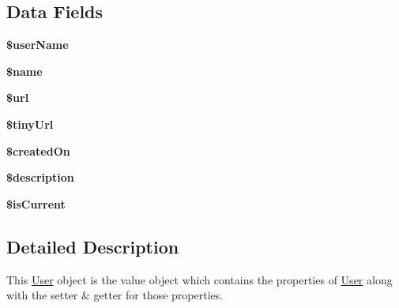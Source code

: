 \subsection*{Data Fields}
\begin{DoxyCompactItemize}
\item 
\hypertarget{class_avatar_aff20833df389a26c0f9384512eec4a68}{{\bfseries \$user\+Name}}\label{class_avatar_aff20833df389a26c0f9384512eec4a68}

\item 
\hypertarget{class_avatar_ab2fc40d43824ea3e1ce5d86dee0d763b}{{\bfseries \$name}}\label{class_avatar_ab2fc40d43824ea3e1ce5d86dee0d763b}

\item 
\hypertarget{class_avatar_acf215f34a917d014776ce684a9ee8909}{{\bfseries \$url}}\label{class_avatar_acf215f34a917d014776ce684a9ee8909}

\item 
\hypertarget{class_avatar_a9c2c8dd33e943747d8c8e86be353e62b}{{\bfseries \$tiny\+Url}}\label{class_avatar_a9c2c8dd33e943747d8c8e86be353e62b}

\item 
\hypertarget{class_avatar_a980da9bfdce6ade7abd3568e89f80013}{{\bfseries \$created\+On}}\label{class_avatar_a980da9bfdce6ade7abd3568e89f80013}

\item 
\hypertarget{class_avatar_a87b032cba06009e3467abf1c8018d960}{{\bfseries \$description}}\label{class_avatar_a87b032cba06009e3467abf1c8018d960}

\item 
\hypertarget{class_avatar_a511bbc700c6ae4c37fa4cf6c3cebfc2c}{{\bfseries \$is\+Current}}\label{class_avatar_a511bbc700c6ae4c37fa4cf6c3cebfc2c}

\end{DoxyCompactItemize}


\subsection{Detailed Description}
This \hyperlink{class_user}{User} object is the value object which contains the properties of \hyperlink{class_user}{User} along with the setter \& getter for those properties. 

